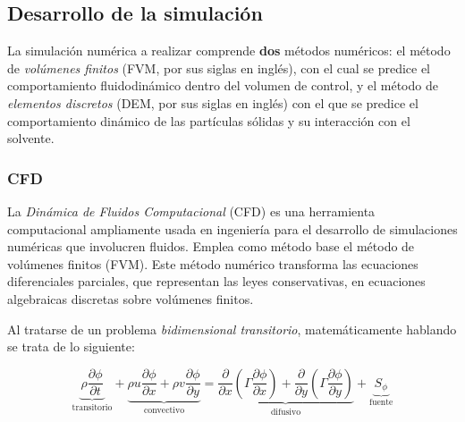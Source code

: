 \newpage

\subsection{Desarrollo de la simulaci\'on}

\noindent
\justify

La simulaci\'on num\'erica a realizar comprende \textbf{dos} m\'etodos num\'ericos: el m\'etodo de \textit{vol\'umenes finitos} (FVM, por sus siglas en ingl\'es), con el cual se predice el comportamiento fluidodin\'amico dentro del volumen de control, y el m\'etodo de \textit{elementos discretos} (DEM, por sus siglas en ingl\'es) con el que se predice el comportamiento din\'amico de las part\'iculas s\'olidas y su interacci\'on con el solvente.

\subsubsection{CFD}

\noindent
\justify

La \textit{Din\'amica de Fluidos Computacional} (CFD) es una herramienta computacional ampliamente usada en ingenier\'ia para el desarrollo de simulaciones num\'ericas que involucren fluidos. Emplea como m\'etodo base el m\'etodo de vol\'umenes finitos (FVM). Este m\'etodo num\'erico transforma las ecuaciones diferenciales parciales, que representan las leyes conservativas, en ecuaciones algebraicas discretas sobre vol\'umenes finitos.

\noindent
\justify

Al tratarse de un problema \textit{bidimensional transitorio}, matem\'aticamente hablando se trata de lo siguiente:

\begin{equation}
    \underbrace{\rho \frac{\partial \phi}{\partial t}}_{\text{transitorio}} + \underbrace{\rho u \frac{\partial \phi}{\partial x} + \rho v \frac{\partial \phi}{\partial y}}_{\text{convectivo}} = \underbrace{ \frac{\partial}{\partial x} \left( \Gamma \frac{\partial \phi}{\partial x} \right) + \frac{\partial}{\partial y} \left( \Gamma \frac{\partial \phi}{\partial y} \right)}_{\text{difusivo}} + \underbrace{S_{\phi}}_{\text{fuente}}
    \tag{9}
    \label{2D}
\end{equation}
